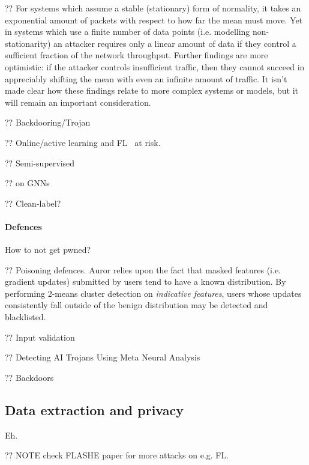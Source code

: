 ?? For systems which assume a stable (stationary) form of normality, it takes an exponential amount of packets with respect to how far the mean must move.
Yet in systems which use a finite number of data points (i.e. modelling non-stationarity) an attacker requires only a linear amount of data if they control a sufficient fraction of the network throughput.
Further findings are more optimistic: if the attacker controls insufficient traffic, then they cannot succeed in appreciably shifting the mean with even an infinite amount of traffic.
It isn't made clear how these findings relate to more complex systems or models, but it will remain an important consideration. \cite{DBLP:journals/jmlr/KloftL10}

?? Backdooring/Trojan~\parencite{DBLP:journals/corr/abs-1712-05526,DBLP:conf/eurosp/TanS20}

?? Online/active learning and FL~\parencite{DBLP:conf/aistats/BagdasaryanVHES20} at risk.

?? Semi-supervised~\parencite{DBLP:conf/uss/Carlini21}

?? on GNNs~\parencite{DBLP:conf/uss/XiPJ021}

?? Clean-label?~\parencite{DBLP:journals/corr/abs-2005-00191}

\paragraph{Defences}
How to not get pwned?

?? Poisoning defences. Auror \cite{DBLP:conf/acsac/ShenTS16} relies upon the fact that masked features (i.e. gradient updates) submitted by users tend to have a known distribution.
By performing 2-means cluster detection on \emph{indicative features}, users whose updates consistently fall outside of the benign distribution may be detected and blacklisted.

?? Input validation~\parencite{DBLP:conf/acsac/DoanAR20}

?? Detecting AI Trojans Using Meta Neural Analysis~\parencite{DBLP:conf/sp/XuWLBGL21}

?? Backdoors~\parencite{DBLP:conf/sp/WangYSLVZZ19}

\subsection{Data extraction and privacy}\label{sec:data-extraction-and-privacy}
Eh.

?? NOTE check FLASHE paper for more attacks on e.g. FL.

